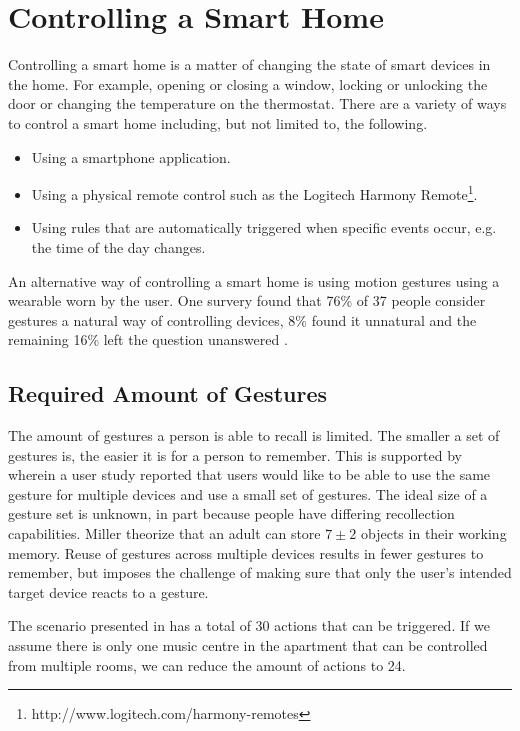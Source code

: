 \section{Controlling a Smart Home}
\label{sec:introduction:gesture-control}

Controlling a smart home is a matter of changing the state of smart devices in the home. For example, opening or closing a window, locking or unlocking the door or changing the temperature on the thermostat. There are a variety of ways to control a smart home including, but not limited to, the following.

\begin{itemize}
\item Using a smartphone application.
\item Using a physical remote control such as the Logitech Harmony Remote\footnote{http://www.logitech.com/harmony-remotes}.
\item Using rules that are automatically triggered when specific events occur, e.g. the time of the day changes.
\end{itemize}

An alternative way of controlling a smart home is using motion gestures using a wearable worn by the user. One survery found that 76\% of 37 people consider gestures a natural way of controlling devices, 8\% found it unnatural and the remaining 16\% left the question unanswered \cite{Kela2006}.

\subsection{Required Amount of Gestures}

The amount of gestures a person is able to recall is limited. The smaller a set of gestures is, the easier it is for a person to remember. This is supported by \cite{Kela2006} wherein a user study reported that users would like to be able to use the same gesture for multiple devices and use a small set of gestures.
The ideal size of a gesture set is unknown, in part because people have differing recollection capabilities. Miller \cite{miller1956magical} theorize that an adult can store $7 \pm 2$ objects in their working memory.
Reuse of gestures across multiple devices results in fewer gestures to remember, but imposes the challenge of making sure that only the user's intended target device reacts to a gesture.

The scenario presented in  has a total of 30 actions that can be triggered. If we assume there is only one music centre in the apartment that can be controlled from multiple rooms, we can reduce the amount of actions to 24.

